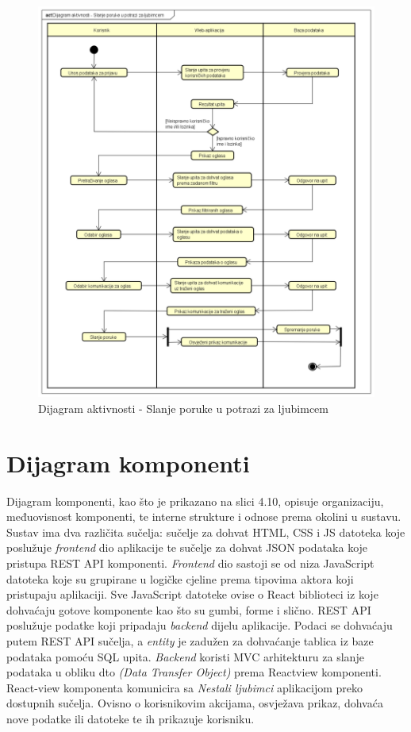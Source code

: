 			\begin{figure}[!htb]
				\centering
				\includegraphics[width=\textwidth]{slike/Dijagram_aktivnosti_-_Slanje_poruke_u_potrazi_za_ljubimcem.png}
				\caption{Dijagram aktivnosti - Slanje poruke u potrazi za ljubimcem}
			\end{figure}

                \clearpage
                \newpage
                \eject
   
		\section{Dijagram komponenti}
		
			\noindent Dijagram komponenti, kao što je prikazano na slici 4.10, opisuje organizaciju, međuovisnost komponenti, te interne strukture i odnose prema okolini u sustavu. Sustav ima dva različita sučelja: sučelje za dohvat HTML, CSS i JS datoteka koje poslužuje \textit{frontend} dio aplikacije te sučelje za dohvat JSON podataka koje pristupa REST API komponenti. \textit{Frontend} dio sastoji se od niza JavaScript datoteka koje su grupirane u logičke cjeline prema tipovima aktora koji pristupaju aplikaciji. Sve JavaScript datoteke ovise o React biblioteci iz koje dohvaćaju gotove komponente kao što su gumbi, forme i slično. REST API poslužuje podatke koji pripadaju \textit{backend} dijelu aplikacije. Podaci se dohvaćaju putem REST API sučelja, a \textit{entity} je zadužen za dohvaćanje tablica iz baze podataka pomoću SQL upita. \textit{Backend} koristi MVC arhitekturu za slanje podataka u obliku dto \textit{(Data Transfer Object)} prema Reactview komponenti. React-view komponenta komunicira sa \textit{Nestali ljubimci} aplikacijom preko dostupnih sučelja. Ovisno o korisnikovim akcijama, osvježava prikaz, dohvaća nove podatke ili datoteke te ih prikazuje korisniku.

